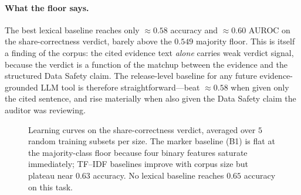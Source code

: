 \documentclass[11pt,a4paper]{article}
\begin{document}
\paragraph{What the floor says.}
The best lexical baseline reaches only $\approx0.58$ accuracy and
$\approx0.60$ AUROC on the share-correctness verdict, barely above
the $0.549$ majority floor. This is itself a finding of the corpus:
the cited evidence text \emph{alone} carries weak verdict signal,
because the verdict is a function of the matchup between the
evidence and the structured Data Safety claim. The release-level
baseline for any future evidence-grounded LLM tool is therefore
straightforward---beat $\approx0.58$ when given only the cited
sentence, and rise materially when also given the Data Safety claim
the auditor was reviewing.

\begin{figure}[t]
\centering
{}
\caption{Learning curves on the share-correctness verdict, averaged
over $5$ random training subsets per size. The marker baseline (B1)
is flat at the majority-class floor because four binary features
saturate immediately; TF--IDF baselines improve with corpus size but
plateau near $0.63$ accuracy. No lexical baseline reaches $0.65$
accuracy on this task.}
\label{fig:learn}
\end{figure}
\end{document}
